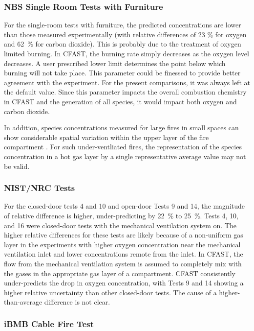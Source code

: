 \subsubsection{NBS Single Room Tests with Furniture}

For the single-room tests with furniture, the predicted concentrations are lower than those 
measured experimentally (with relative differences of 23 \% for oxygen and 62~\% for carbon dioxide).  This is probably due to the treatment of oxygen limited burning.  In CFAST, the burning rate simply decreases as the oxygen level decreases.  A user prescribed lower limit determines the point below which burning will not take place.  This parameter could be finessed to provide better agreement with the experiment.  For the present comparisons, it was always left at the default value. Since this parameter impacts the overall combustion chemistry in CFAST and the generation of all species, it would impact both oxygen and carbon dioxide.

In addition, species concentrations measured for large fires in small spaces can show considerable spatial variation within the upper layer of the fire compartment \cite{Bundy:2007}. For such under-ventliated fires, the representation of the species concentration in a hot gas layer by a single representative average value may not be valid.

\subsubsection{NIST/NRC Tests}

For the closed-door tests 4 and 10 and open-door Tests 9 and 14, the magnitude of relative difference is higher, under-predicting by 22~\% to 25~\%.  Tests 4, 10, and 16 were closed-door tests with the mechanical ventilation system on.  The higher relative differences for these tests are likely because of a non-uniform gas layer in the experiments with higher oxygen concentration near the mechanical ventilation inlet and lower concentrations remote from the inlet.  In CFAST, the flow from the mechanical ventilation system is assumed to completely mix with the gases in the appropriate gas layer of a compartment.  CFAST consistently under-predicts the drop in oxygen concentration, with Tests 9 and 14 showing a higher relative uncertainty than other closed-door tests.  The cause of a higher-than-average difference is not clear.

\subsubsection{iBMB Cable Fire Test}

